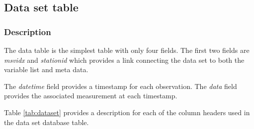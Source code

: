 \subsection{Data set table}
\label{sec:dbdt}

\subsubsection{Description}
\label{sec:dbdtdes}
The data table is the simplest table with only four fields.  
The first two fields are \emph{msvidx} and \emph{stationid} which provides a link connecting the data set to both the variable list and meta data.

The \emph{datetime} field provides a timestamp for each observation.  
The \emph{data} field provides the associated measurement at each timestamp.

Table \ref{tab:dataset} provides a description for each of the column headers used in the data set database table.

